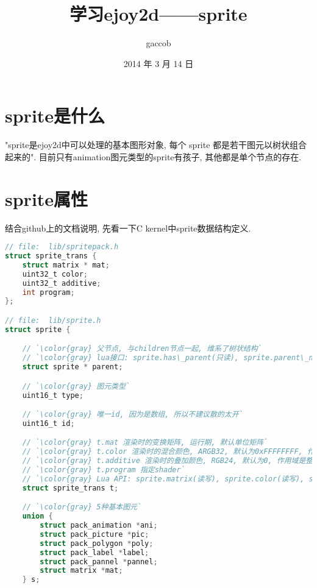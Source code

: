

\title {\ZHH \huge 学习ejoy2d——sprite}
\author {\small gaccob}
\date {\small 2014 年 3 月 14 日}
\maketitle

\section {\ZHH sprite是什么} {
    { "sprite是ejoy2d中可以处理的基本图形对象, 每个 sprite 都是若干图元以树状组合起来的". 目前只有animation图元类型的sprite有孩子, 其他都是单个节点的存在. }\par
}

\section {\ZHH sprite属性} {

    { 结合github上的文档说明, 先看一下C kernel中sprite数据结构定义.}\par

\begin{lstlisting}[language=C]
// file:  lib/spritepack.h
struct sprite_trans {
    struct matrix * mat;
    uint32_t color;
    uint32_t additive;
    int program;
};

// file:  lib/sprite.h
struct sprite {

    // `\color{gray} 父节点, 与children节点一起, 维系了树状结构`
    // `\color{gray} lua接口: sprite.has\_parent(只读), sprite.parent\_name(只读)`
    struct sprite * parent;

    // `\color{gray} 图元类型`
    uint16_t type;

    // `\color{gray} 唯一id, 因为是数组, 所以不建议散的太开`
    uint16_t id;

    // `\color{gray} t.mat 渲染时的变换矩阵, 运行期, 默认单位矩阵`
    // `\color{gray} t.color 渲染时的混合颜色, ARGB32, 默认为0xFFFFFFFF, 作用域是整个子树, 最常见的是做alpha半透明效果, 例如0x80FFFFFF就是50\%的半透明`
    // `\color{gray} t.additive 渲染时的叠加颜色, RGB24, 默认为0, 作用域是整个子树`
    // `\color{gray} t.program 指定shader`
    // `\color{gray} Lua API: sprite.matrix(读写), sprite.color(读写), sprite.additive(读写), sprite.program(只读)`
    struct sprite_trans t;

    // `\color{gray} 5种基本图元`
    union {
        struct pack_animation *ani;
        struct pack_picture *pic;
        struct pack_polygon *poly;
        struct pack_label *label;
        struct pack_pannel *pannel;
        struct matrix *mat;
    } s;


\end{lstlisting}}
